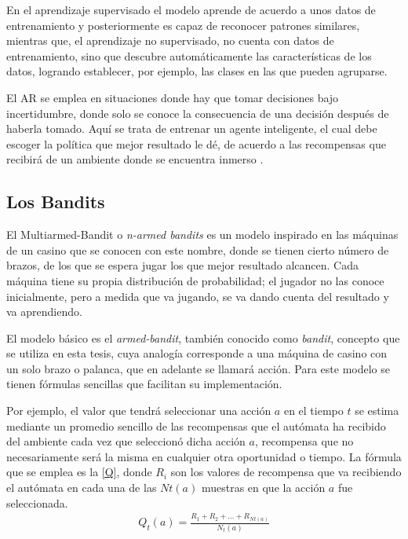 En el aprendizaje supervisado el modelo aprende de acuerdo a unos datos de entrenamiento y posteriormente es capaz de reconocer patrones similares, mientras que, el aprendizaje no supervisado, no cuenta con datos de entrenamiento, sino que descubre automáticamente las características de los datos, logrando establecer, por ejemplo, las clases en las que pueden agruparse.

El AR se emplea en situaciones donde hay que tomar decisiones bajo incertidumbre, donde solo se conoce la consecuencia de una decisión después de haberla tomado. Aquí se trata de entrenar un agente inteligente, el cual debe escoger la política que mejor resultado le dé, de acuerdo a las recompensas que recibirá de un ambiente donde se encuentra inmerso \citep{sutton1992reinforcement}.

\subsection{Los Bandits}
\label{Los Bandits}

El Multiarmed-Bandit o \textit{n-armed bandits} es un modelo inspirado en las máquinas de un casino que se conocen con este nombre, donde se tienen cierto número de brazos, de los que se espera jugar los que mejor resultado alcancen. Cada máquina tiene su propia distribución de probabilidad; el jugador no las conoce inicialmente, pero a medida que va jugando, se va dando cuenta del resultado y va aprendiendo.

El modelo básico es el \textit{armed-bandit}, también conocido como \textit{bandit}, concepto que se utiliza en esta tesis, cuya analogía corresponde a una máquina de casino con un solo brazo o palanca, que en adelante se llamará acción. Para este modelo se tienen fórmulas sencillas que facilitan su implementación. 

Por ejemplo, el valor que tendrá seleccionar una acción $a$ en el tiempo $t$ se estima mediante un promedio sencillo de las recompensas que el autómata ha recibido del ambiente cada vez que seleccionó dicha acción $a$, recompensa que no necesariamente será la misma en cualquier otra oportunidad o tiempo. La fórmula que se emplea es la \ref{Q}, donde $R_i$ son los valores de recompensa que va recibiendo el autómata en cada una de las $Nt(a)$ muestras en que la acción $a$ fue seleccionada.
\begin{eqnarray}\label{Q}
Q_t(a) = \frac{R_1+R_2+ ...+R_{Nt(a)}}{N_t(a)}
\end{eqnarray}

